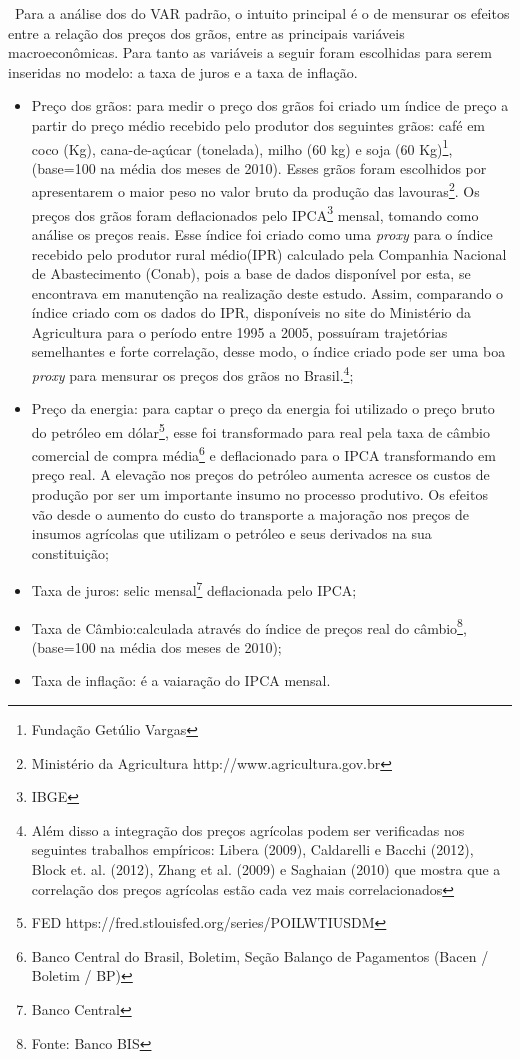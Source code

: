 \documentclass[a4paper,12pt,oneside,titlepage]{article}
\begin{document}
\ Para a análise dos do VAR padrão, o intuito principal é o de mensurar os efeitos entre a relação dos preços dos grãos, entre as principais variáveis macroeconômicas. Para tanto as variáveis a seguir foram escolhidas para serem inseridas no modelo: a taxa de juros e a taxa de inflação. 
\begin{itemize}
	\item{Preço dos grãos: para medir o preço dos grãos foi criado um índice de preço a partir do preço médio recebido pelo produtor dos seguintes grãos: café em coco (Kg), cana-de-açúcar (tonelada), milho (60 kg) e soja (60 Kg)\footnote{Fundação Getúlio Vargas}, (base=100 na média dos meses de 2010). Esses grãos foram escolhidos por apresentarem o maior peso no valor bruto da produção das lavouras\footnote{Ministério da Agricultura http://www.agricultura.gov.br}. Os preços dos grãos foram deflacionados pelo IPCA\footnote{IBGE} mensal, tomando como análise os preços reais. Esse índice foi criado como uma \textit{proxy} para o índice recebido pelo produtor rural médio(IPR) calculado pela Companhia Nacional de Abastecimento (Conab), pois a base de dados disponível por esta, se encontrava em manutenção na realização deste estudo. Assim, comparando o índice criado com os dados do IPR, disponíveis no site do Ministério da Agricultura para o período entre 1995 a 2005, possuíram trajetórias semelhantes e forte correlação, desse modo, o índice criado pode ser uma boa \textit{proxy} para mensurar os preços dos grãos no Brasil.\footnote{ Além disso a integração dos preços agrícolas podem ser verificadas nos seguintes trabalhos empíricos: Libera (2009), Caldarelli e Bacchi
			(2012), Block et. al. (2012), Zhang et al. (2009) e Saghaian (2010) que mostra que a correlação dos preços agrícolas estão cada vez mais correlacionados};} 
\item{Preço da energia: para captar o preço da energia foi utilizado o preço bruto do petróleo em dólar\footnote{FED https://fred.stlouisfed.org/series/POILWTIUSDM}, esse foi transformado para real pela taxa de câmbio comercial de compra média\footnote{Banco Central do Brasil, Boletim, Seção Balanço de Pagamentos (Bacen / Boletim / BP)} e deflacionado para o IPCA transformando em preço real. A elevação nos preços do petróleo aumenta acresce os
	custos de produção por ser um importante insumo no processo
	produtivo. Os efeitos vão desde o aumento do custo
	do transporte a majoração nos preços de insumos agrícolas
	que utilizam o petróleo e seus derivados na sua constituição;}

\item{Taxa de juros: selic mensal\footnote{ Banco Central} deflacionada pelo IPCA;}  

\item{Taxa de Câmbio:calculada através do índice de preços real do câmbio\footnote{Fonte: Banco BIS}, (base=100 na média dos meses de 2010);}   

\item{Taxa de inflação: é a vaiaração do IPCA mensal.}

\end{itemize}
\end{document}
